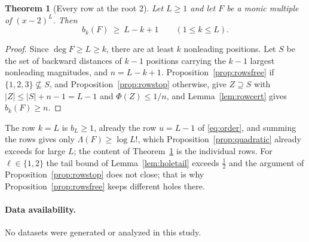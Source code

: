\documentclass[11pt]{article}
\newtheorem{theorem}{Theorem}[section]
\begin{document}
\begin{theorem}[Every row at the root $2$]\label{thm:everyrow}
Let $L\ge1$ and let $F$ be a monic multiple of $(x-2)^L$.  Then
\[
  b_k(F)\ \ge\ L-k+1\qquad(1\le k\le L).
\]
\end{theorem}

\begin{proof}
Since $\deg F\ge L\ge k$, there are at least $k$ nonleading positions.  Let
$S$ be the set of backward distances of $k-1$ positions carrying the $k-1$
largest nonleading magnitudes, and $n=L-k+1$.  Proposition~\ref{prop:rowsfree}
if $\{1,2,3\}\not\subseteq S$, and Proposition~\ref{prop:rowstop} otherwise,
give $Z\supseteq S$ with $|Z|\le|S|+n-1=L-1$ and $\Phi(Z)\le1/n$, and
Lemma~\ref{lem:rowcert} gives $b_k(F)\ge n$.
\end{proof}

The row $k=L$ is $b_L\ge1$, already the row $u=L-1$ of \eqref{eq:order}, and summing the rows gives only
$\Lambda(F)\ge\log L!$, which Proposition~\ref{prop:quadratic} already
exceeds for large $L$; the content of Theorem~\ref{thm:everyrow} is the
individual rows.  For $\ell\in\{1,2\}$ the tail bound of Lemma~\ref{lem:holetail}
exceeds $\frac12$ and the argument of Proposition~\ref{prop:rowstop} does
not close; that is why Proposition~\ref{prop:rowsfree} keeps different
holes there.

\paragraph{Data availability.}
No datasets were generated or analyzed in this study.
\end{document}
